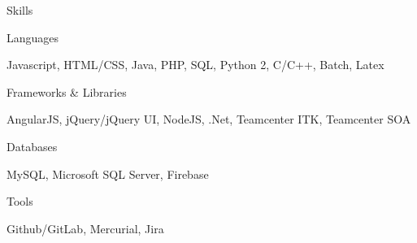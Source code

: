 \documentclass{resume} %
\begin{document}
\begin{rSection}{Skills}

    \begin{rSubsection}{Languages}{}{}{}
        \item Javascript, HTML/CSS, Java, PHP, SQL, Python 2, C/C++, Batch, Latex
    \end{rSubsection}

    \begin{rSubsection}{Frameworks \& Libraries}{}{}{}
        \item AngularJS, jQuery/jQuery UI, NodeJS, .Net, Teamcenter ITK, Teamcenter SOA
    \end{rSubsection}

    \begin{rSubsection}{Databases}{}{}{}
        \item MySQL, Microsoft SQL Server, Firebase
    \end{rSubsection}

    \begin{rSubsection}{Tools}{}{}{}
        \item Github/GitLab, Mercurial, Jira
    \end{rSubsection}
        


\end{rSection}
\end{document}
